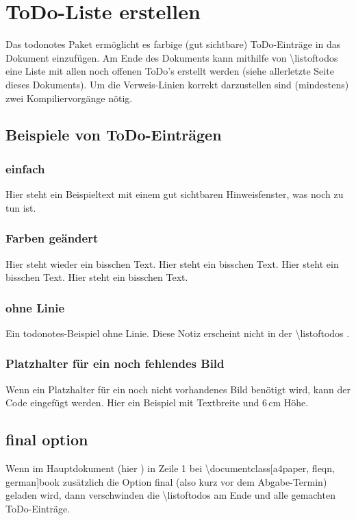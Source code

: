 \section{ToDo-Liste erstellen}%
%
Das todonotes Paket ermöglicht es farbige (gut sichtbare) ToDo-Einträge in das Dokument einzufügen. Am Ende des Dokuments kann mithilfe von \textbackslash listoftodos eine Liste mit allen noch offenen ToDo's erstellt werden (siehe allerletzte Seite dieses Dokuments). Um die Verweis-Linien korrekt darzustellen sind (mindestens) zwei Kompiliervorgänge nötig. %
%
\subsection{Beispiele von ToDo-Einträgen}%
%
\subsubsection{einfach}%
%
Hier steht ein Beispieltext mit  einem gut sichtbaren Hinweisfenster, was noch zu tun ist. %
%
\subsubsection{Farben geändert}%
%
Hier steht wieder ein bisschen Text.  Hier steht ein bisschen Text. Hier steht ein bisschen Text. Hier steht ein bisschen Text. \blindtext {}%
%
\subsubsection{ohne Linie}%
%
Ein todonotes-Beispiel ohne Linie. Diese Notiz erscheint nicht in der \textbackslash listoftodos .%
%
\newpage%
\subsubsection{Platzhalter für ein noch fehlendes Bild}%
%
Wenn ein Platzhalter für ein noch nicht vorhandenes Bild benötigt wird, kann der Code  eingefügt werden. Hier ein Beispiel mit Textbreite und 6\,cm Höhe.\\%
%
%
\subsection{final option}%
Wenn im Hauptdokument (hier ) in Zeile 1 bei \textbackslash documentclass[a4paper, fleqn, german]{book} zusätzlich die Option final (also kurz vor dem Abgabe-Termin) geladen wird, dann verschwinden die \textbackslash listoftodos am Ende und alle gemachten ToDo-Einträge.%
%